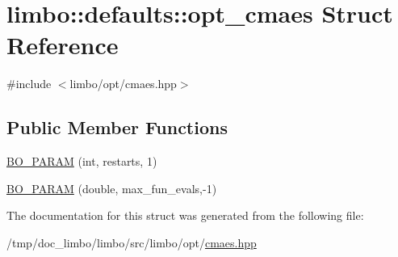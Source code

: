 \hypertarget{structlimbo_1_1defaults_1_1opt__cmaes}{}\section{limbo\+:\+:defaults\+:\+:opt\+\_\+cmaes Struct Reference}
\label{structlimbo_1_1defaults_1_1opt__cmaes}


{\ttfamily \#include $<$limbo/opt/cmaes.\+hpp$>$}

\subsection*{Public Member Functions}
\begin{DoxyCompactItemize}
\item 
\hyperlink{group__opt__defaults_gaba7127b5e591a72095bd6c3a4155828d}{B\+O\+\_\+\+P\+A\+R\+A\+M} (int, restarts, 1)
\item 
\hyperlink{group__opt__defaults_ga5130bd236acff913c59380059474ebab}{B\+O\+\_\+\+P\+A\+R\+A\+M} (double, max\+\_\+fun\+\_\+evals,-\/1)
\end{DoxyCompactItemize}


The documentation for this struct was generated from the following file\+:\begin{DoxyCompactItemize}
\item 
/tmp/doc\+\_\+limbo/limbo/src/limbo/opt/\hyperlink{cmaes_8hpp}{cmaes.\+hpp}\end{DoxyCompactItemize}

